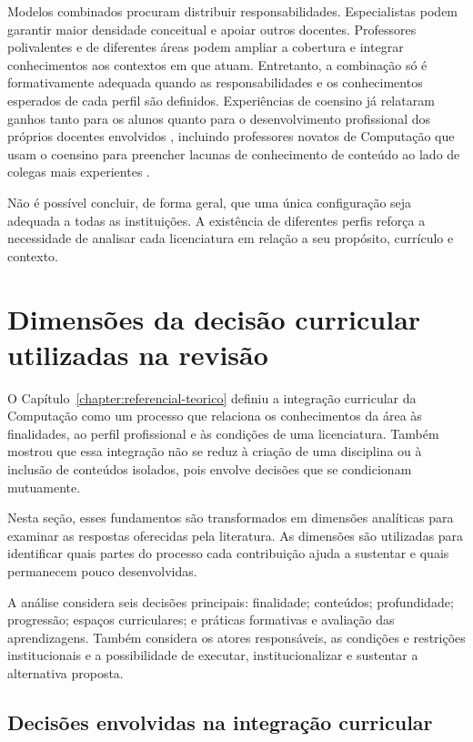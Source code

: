 Modelos combinados procuram distribuir responsabilidades. Especialistas podem garantir maior densidade conceitual e apoiar outros docentes. Professores polivalentes e de diferentes áreas podem ampliar a cobertura e integrar conhecimentos aos contextos em que atuam. Entretanto, a combinação só é formativamente adequada quando as responsabilidades e os conhecimentos esperados de cada perfil são definidos. Experiências de coensino já relataram ganhos tanto para os alunos quanto para o desenvolvimento profissional dos próprios docentes envolvidos \cite{piech2020coteaching}, incluindo professores novatos de Computação que usam o coensino para preencher lacunas de conhecimento de conteúdo ao lado de colegas mais experientes \cite{yadav2024diving}.

Não é possível concluir, de forma geral, que uma única configuração seja adequada a todas as instituições. A existência de diferentes perfis reforça a necessidade de analisar cada licenciatura em relação a seu propósito, currículo e contexto.

\section{Dimensões da decisão curricular utilizadas na revisão}
\label{sec:decisao-curricular}

O Capítulo~\ref{chapter:referencial-teorico} definiu a integração curricular da Computação como um processo que relaciona os conhecimentos da área às finalidades, ao perfil profissional e às condições de uma licenciatura. Também mostrou que essa integração não se reduz à criação de uma disciplina ou à inclusão de conteúdos isolados, pois envolve decisões que se condicionam mutuamente.

Nesta seção, esses fundamentos são transformados em dimensões analíticas para examinar as respostas oferecidas pela literatura. As dimensões são utilizadas para identificar quais partes do processo cada contribuição ajuda a sustentar e quais permanecem pouco desenvolvidas.

A análise considera seis decisões principais: finalidade; conteúdos; profundidade; progressão; espaços curriculares; e práticas formativas e avaliação das aprendizagens. Também considera os atores responsáveis, as condições e restrições institucionais e a possibilidade de executar, institucionalizar e sustentar a alternativa proposta.

\subsection{Decisões envolvidas na integração curricular}
\label{subsec:decisoes-integracao-curricular}

